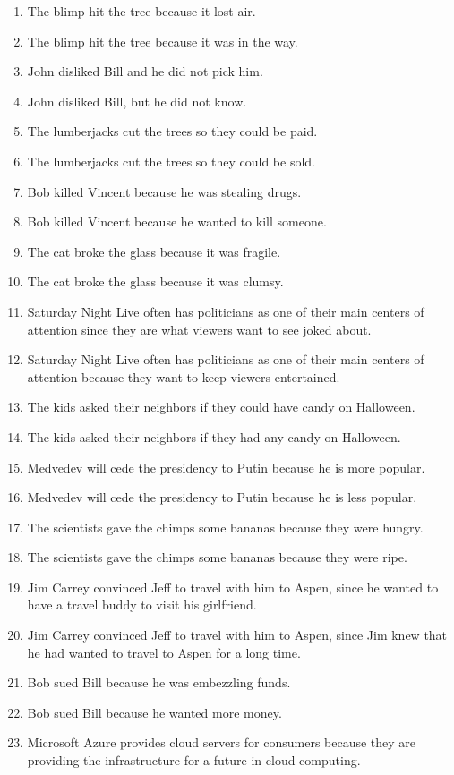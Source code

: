 \documentclass{article}
\begin{document}
\begin{enumerate}
	\item The blimp hit the tree because it lost air.
	\item The blimp hit the tree because it was in the way.
	\item John disliked Bill and he did not pick him.
	\item John disliked Bill, but he did not know.
	\item The lumberjacks cut the trees so they could be paid.
	\item The lumberjacks cut the trees so they could be sold.
	\item Bob killed Vincent because he was stealing drugs.
	\item Bob killed Vincent because he wanted to kill someone.
	\item The cat broke the glass because it was fragile.
	\item The cat broke the glass because it was clumsy.
	\item Saturday Night Live often has politicians as one of their main centers of attention since they are what viewers want to see joked about.
	\item Saturday Night Live often has politicians as one of their main centers of attention because they want to keep viewers entertained.
	\item The kids asked their neighbors if they could have candy on Halloween.
	\item The kids asked their neighbors if they had any candy on Halloween.
	\item Medvedev will cede the presidency to Putin because he is more popular.
	\item Medvedev will cede the presidency to Putin because he is less popular.
	\item The scientists gave the chimps some bananas because they were hungry.
	\item The scientists gave the chimps some bananas because they were ripe.
	\item Jim Carrey convinced Jeff to travel with him to Aspen, since he wanted to have a travel buddy to visit his girlfriend.
	\item Jim Carrey convinced Jeff to travel with him to Aspen, since Jim knew that he had wanted to travel to Aspen for a long time.
	\item Bob sued Bill because he was embezzling funds.
	\item Bob sued Bill because he wanted more money.
	\item Microsoft Azure provides cloud servers for consumers because they are providing the infrastructure for a future in cloud computing.

\end{enumerate}
\end{document}
